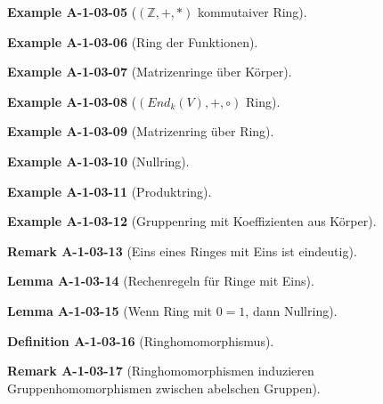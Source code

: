 \documentclass[10pt, letterpaper]{article}
\newcommand{\Z}{\mathbb{Z}}
\newcommand{\CustomHeading}[3]{%
  \par\medskip\noindent%
  \textbf{#1 #2} \textnormal{(#3)}.\enskip%
}
\newenvironment{DEF}[2]{\CustomHeading{Definition}{#1}{#2}}{}
\newenvironment{LEM}[2]{\CustomHeading{Lemma}{#1}{#2}}{}
\newenvironment{REM}[2]{\CustomHeading{Remark}{#1}{#2}}{}
\newenvironment{EXA}[2]{\CustomHeading{Example}{#1}{#2}}{}
\begin{document}
\begin{EXA}{A-1-03-05}{$(\Z,+,*)$ kommutaiver Ring}
\end{EXA}

\begin{EXA}{A-1-03-06}{Ring der Funktionen}
\end{EXA}

\begin{EXA}{A-1-03-07}{Matrizenringe über Körper}
\end{EXA}

\begin{EXA}{A-1-03-08}{$(End_k(V),+,\circ)$ Ring}
\end{EXA}

\begin{EXA}{A-1-03-09}{Matrizenring über Ring}
\end{EXA}

\begin{EXA}{A-1-03-10}{Nullring}
\end{EXA}

\begin{EXA}{A-1-03-11}{Produktring}
\end{EXA}

\begin{EXA}{A-1-03-12}{Gruppenring mit Koeffizienten aus Körper}
\end{EXA}

\begin{REM}{A-1-03-13}{Eins eines Ringes mit Eins ist eindeutig}
\end{REM}

\begin{LEM}{A-1-03-14}{Rechenregeln für Ringe mit Eins}
\end{LEM}

\begin{LEM}{A-1-03-15}{Wenn Ring mit $0=1$, dann Nullring}
\end{LEM}

\begin{DEF}{A-1-03-16}{Ringhomomorphismus}
\end{DEF}

\begin{REM}{A-1-03-17}{Ringhomomorphismen induzieren Gruppenhomomorphismen zwischen abelschen Gruppen}
\end{REM}
\end{document}
